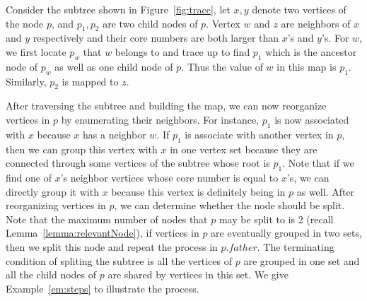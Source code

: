 \begin{example}
\label{em:reorganize}
Consider the subtree shown in Figure~\ref{fig:trace}, let $x,y$ denote two vertices of the node $p$, and $p_1,p_2$ are two child nodes of $p$. Vertex $w$ and $z$ are neighbors of $x$ and $y$ respectively and their core numbers are both larger than $x$'s and $y$'s. For $w$, we first locate $p_w$ that $w$ belongs to and trace up to find $p_1$ which is the ancestor node of $p_w$ as well as one child node of $p$. Thus the value of $w$ in this map is $p_1$. Similarly, $p_2$ is mapped to $z$.
\end{example}
After traversing the subtree and building the map, we can now reorganize vertices in $p$ by enumerating their neighbors. For instance, $p_1$ is now associated with $x$ because $x$ has a neighbor $w$. If $p_1$ is associate with another vertex in $p$, then we can group this vertex with $x$ in one vertex set because they are connected through some vertices of the subtree whose root is $p_1$. Note that if we find one of $x$'s neighbor vertices whose core number is equal to $x$'s, we can directly group it with $x$ because this vertex is definitely being in $p$ as well. 
After reorganizing vertices in $p$, we can determine whether the node should be split. Note that the maximum number of nodes that $p$ may be split to is 2 (recall Lemma~\ref{lemma:relevantNode}), if vertices in $p$ are eventually grouped in two sets, then we split this node and repeat the process in $p.father$. 
The terminating condition of spliting the subtree is all the vertices of $p$ are grouped in one set and all the child nodes of $p$ are shared by vertices in this set. We give Example~\ref{em:steps} to illustrate the process.

